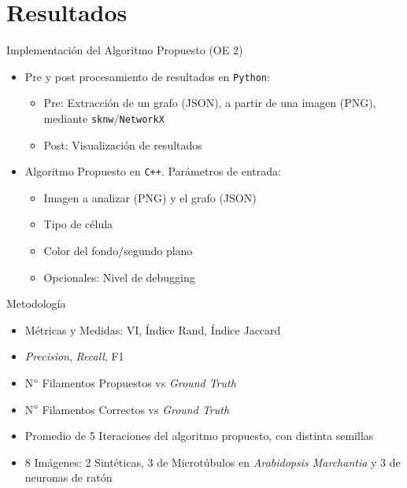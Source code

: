 \section{Resultados}

\begin{frame}{Implementaci\'on del Algoritmo Propuesto (OE 2)}
    \begin{itemize}
        \item Pre y post procesamiento de resultados en {\tt Python}: 
        \begin{itemize}
            \item Pre: Extracci\'on de un grafo (JSON), a partir de una imagen (PNG),  mediante {\tt sknw}/{\tt NetworkX}
            \item Post: Visualizaci\'on de resultados
        \end{itemize}
        
        \item Algoritmo Propuesto en {\tt C++}. Par\'ametros de entrada:
        \begin{itemize}
            \item Imagen a analizar (PNG) y el grafo (JSON)
            \item Tipo de c\'elula
            \item Color del fondo/segundo plano
            \item Opcionales: Nivel de debugging
        \end{itemize}
        
        
    \end{itemize}
\end{frame}

\begin{frame}{Metodolog\'ia}
\begin{itemize}
    \item M\'etricas y Medidas: VI, \'Indice Rand, \'Indice Jaccard
    \item {\it Precision}, {\it Recall}, F1
    \item N$\degree$ Filamentos Propuestos vs {\it Ground Truth}
    \item N$\degree$ Filamentos Correctos vs {\it Ground Truth}
    \item Promedio de 5 Iteraciones del algoritmo propuesto, con distinta semillas
    \item 8 Im\'agenes: 2 Sint\'eticas, 3 de Microt\'ubulos en {\it Arabidopsis Marchantia} y 3 de neuronas de rat\'on
\end{itemize}
\end{frame}

